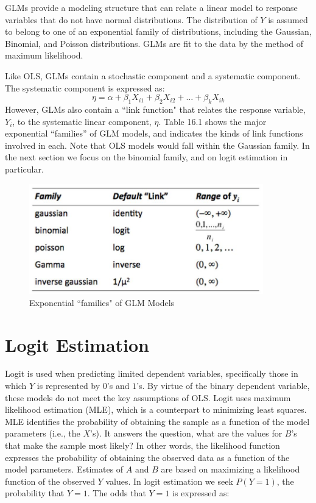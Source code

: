 \documentclass[11pt,openany]{book}\usepackage[]{graphicx}\usepackage[]{color}
\begin{document}
{GLMs provide a modeling structure that can relate a linear model to response variables that do not have normal distributions. The distribution of $Y$ is assumed to belong to one of an exponential family of distributions, including the Gaussian, Binomial, and Poisson distributions.  GLMs are fit to the data by the method of maximum likelihood. 

Like OLS, GLMs contain a stochastic component and a systematic component. The systematic component is expressed as: 
\begin{equation}
  \eta = \alpha + \beta_1 X_{i1} + \beta_2 X_{i2} + \ldots + \beta_k X_{ik}
\end{equation}
However, GLMs also contain a ``link function" that relates the response variable, $Y_i$, to the systematic linear component, $\eta$.  Table 16.1 shows the major exponential “families” of GLM models, and indicates the kinds of link functions involved in each.  Note that OLS models would fall within the Gaussian family.  In the next section we focus on the binomial family, and on logit estimation in particular.

\begin{figure}
        \centering
        \includegraphics[width=4in]{16_Logit/families.jpg}%
        \caption{Exponential ``families" of GLM Models}
\end{figure} 
 

\section{Logit Estimation} 

Logit is used when predicting limited dependent variables,
specifically those in which $Y$ is represented by $0$’s and $1$’s.
By virtue of the binary dependent variable, these models do not meet the
key assumptions of OLS. Logit uses maximum likelihood estimation (MLE),
which is a counterpart to minimizing least squares. 
MLE identifies the probability of obtaining the sample as a function
of the model parameters (i.e., the $X$’s). It answers the question, 
what are the values for $B$’s that make the sample most likely? In
other words, the likelihood 
function expresses the probability of obtaining the observed data as a
function of the model parameters. Estimates of $A$ and $B$ are based
on maximizing a likelihood function of the observed $Y$ values.  
In logit estimation we seek $P(Y=1)$, the probability that $Y=1$. The
odds that $Y=1$ is expressed as:

}
\end{document}
